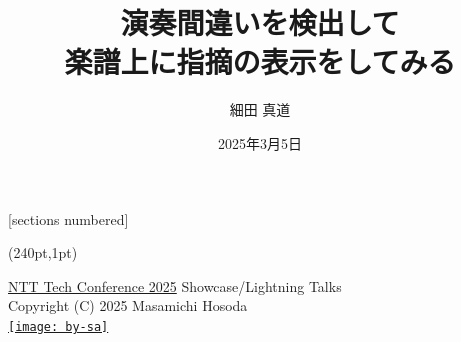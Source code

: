 
[sections numbered]

%
%

\title[演奏間違いを検出し楽譜上に指摘表示]{%
  \Large 演奏間違いを検出して \\ 楽譜上に指摘の表示をしてみる}
\author{細田 真道}
\date[2025-03-05]{2025年3月5日}



\begin{frame}
  \titlepage
  \begin{textblock*}{0.5\linewidth}(240pt,1pt)
    \begin{flushright}
      \tiny
      \href{https://ntt-developers.github.io/ntt-tech-conference/2025/}%
           {NTT Tech Conference 2025} Showcase/Lightning Talks \\
      Copyright (C) 2025 Masamichi Hosoda \\
      \href{https://creativecommons.org/licenses/by-sa/4.0/deed.ja}%
           {\texttt{[image: by-sa]}}
    \end{flushright}
  \end{textblock*}
\end{frame}

